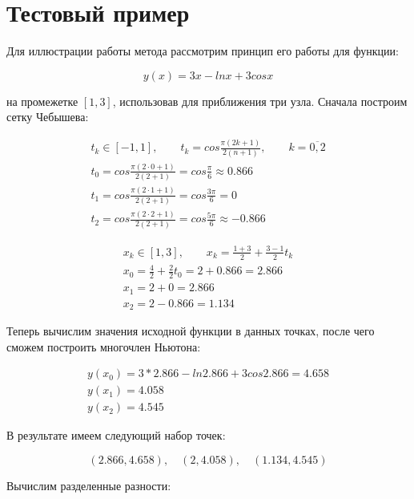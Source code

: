 \documentclass{article}
\begin{document}
\section{Тестовый пример}

Для иллюстрации работы метода рассмотрим принцип его работы для функции:

\begin{equation}
y(x) = 3x - ln x + 3 cos x
\end{equation}

на промежетке $[1, 3]$, использовав для приближения три узла.
Сначала построим сетку Чебышева:

\begin{gather}
t_k \in [-1, 1], \qquad t_k = cos \frac{\pi (2k + 1)}{2(n+1)}, \qquad k = \overline{0, 2} \nonumber \\
t_0 = cos \frac{\pi (2 \cdot 0 + 1)}{2(2 + 1)} = cos \frac{\pi}{6} \approx 0.866 \nonumber \\
t_1 = cos \frac{\pi (2 \cdot 1 + 1)}{2(2 + 1)} = cos \frac{3\pi}{6} = 0 \nonumber \\
t_2 = cos \frac{\pi (2 \cdot 2 + 1)}{2(2 + 1)} = cos \frac{5\pi}{6} \approx -0.866
\end{gather}

\begin{gather}
x_k \in [1, 3], \qquad x_k = \frac{1 + 3}{2} + \frac{3 - 1}{2} t_k \nonumber \\
x_0 = \frac{4}{2} + \frac{2}{2} t_0 = 2 + 0.866 = 2.866 \nonumber \\
x_1 = 2 + 0 = 2.866 \nonumber \\
x_2 = 2 - 0.866 = 1.134
\end{gather}

Теперь вычислим значения исходной функции в данных точках, после чего сможем построить многочлен Ньютона:

\begin{gather}
y(x_0) = 3 * 2.866 - ln 2.866 + 3 cos 2.866 = 4.658 \nonumber \\
y(x_1) = 4.058 \nonumber \\
y(x_2) = 4.545
\end{gather}

В результате имеем следующий набор точек:

\begin{equation}
(2.866, 4.658), \quad (2, 4.058), \quad (1.134, 4.545)
\end{equation}

Вычислим разделенные разности:
\end{document}
